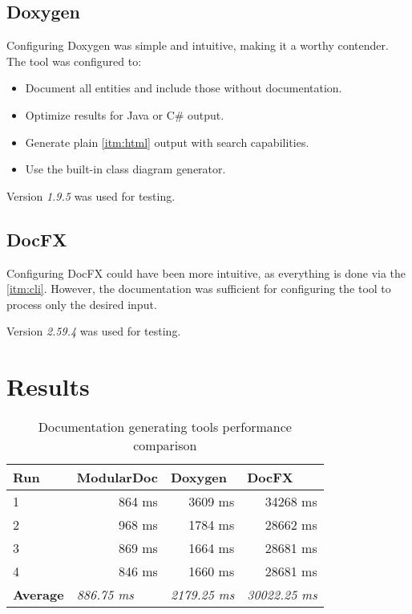 \subsection{Doxygen}

Configuring Doxygen was simple and intuitive, making it a worthy contender. The tool was configured to:
\begin{itemize}
    \item Document all entities and include those without documentation.
    \item Optimize results for Java or C\# output.
    \item Generate plain \ref{itm:html} output with search capabilities.
    \item Use the built-in class diagram generator.
\end{itemize}

Version \textit{1.9.5} was used for testing.

\subsection{DocFX}

Configuring DocFX could have been more intuitive, as everything is done via the \ref{itm:cli}. However, the documentation was sufficient for configuring the tool to process only the desired input.

Version \textit{2.59.4} was used for testing.

\section{Results}

\begin{table}[H]
    \centering
    \label{tab:toolPerformance}
    \begin{tabular}{lrrr}
    \hline
    \textbf{Run}            & \multicolumn{1}{l}{\textbf{ModularDoc}}    & \multicolumn{1}{l}{\textbf{Doxygen}}    & \multicolumn{1}{l}{\textbf{DocFX}}       \\ \hline
    \multicolumn{1}{|l|}{1} & \multicolumn{1}{r|}{864 ms}            & \multicolumn{1}{r|}{3609 ms}            & \multicolumn{1}{r|}{34268 ms}            \\ \hline
    \multicolumn{1}{|l|}{2} & \multicolumn{1}{r|}{968 ms}            & \multicolumn{1}{r|}{1784 ms}            & \multicolumn{1}{r|}{28662 ms}            \\ \hline
    \multicolumn{1}{|l|}{3} & \multicolumn{1}{r|}{869 ms}            & \multicolumn{1}{r|}{1664 ms}            & \multicolumn{1}{r|}{28681 ms}            \\ \hline
    \multicolumn{1}{|l|}{4} & \multicolumn{1}{r|}{846 ms}            & \multicolumn{1}{r|}{1660 ms}            & \multicolumn{1}{r|}{28681 ms}            \\ \hline
    \textbf{Average}        & \multicolumn{1}{l}{\textit{886.75 ms}} & \multicolumn{1}{l}{\textit{2179.25 ms}} & \multicolumn{1}{l}{\textit{30022.25 ms}} \\ \hline
    \end{tabular}
    \caption{Documentation generating tools performance comparison}
\end{table}

